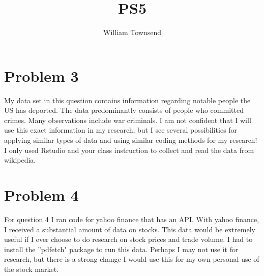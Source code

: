 \documentclass{article}
\title{PS5}
\author{William Townsend}
\begin{document}
\maketitle

\section{Problem 3}

My data set in this question contains information regarding notable people the US has deported. The data predominantly consists of people who committed crimes. Many observations include war criminals. I am not confident that I will use this exact information in my research, but I see several possibilities for applying similar types of data and using similar coding methods for my research! I only used Rstudio and your class instruction to collect and read the data from wikipedia.

\section{Problem 4}

For question 4 I ran code for yahoo finance that has an API. With yahoo finance, I received a substantial amount of data on stocks. This data would be extremely useful if I ever choose to do research on stock prices and trade volume. I had to install the ''pdfetch" package to run this data. Perhaps I may not use it for research, but there is a strong change I would use this for my own personal use of the stock market.
\end{document}
